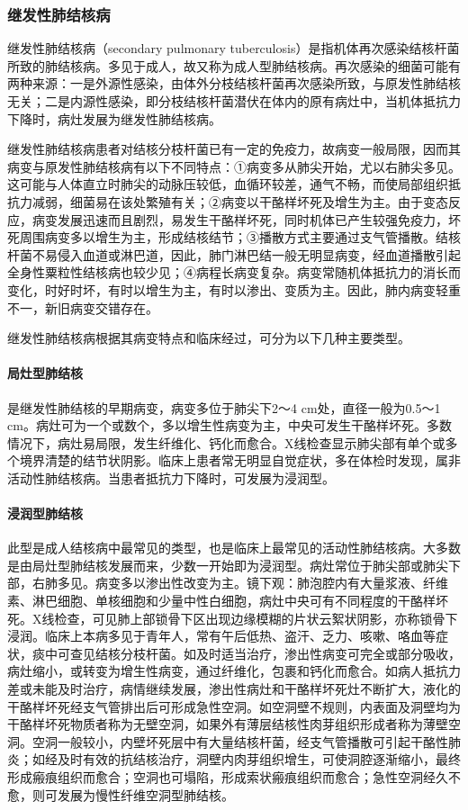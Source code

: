\subsubsection{继发性肺结核病}

继发性肺结核病（secondary pulmonary
tuberculosis）是指机体再次感染结核杆菌所致的肺结核病。多见于成人，故又称为成人型肺结核病。再次感染的细菌可能有两种来源：一是外源性感染，由体外分枝结核杆菌再次感染所致，与原发性肺结核无关；二是内源性感染，即分枝结核杆菌潜伏在体内的原有病灶中，当机体抵抗力下降时，病灶发展为继发性肺结核病。

继发性肺结核病患者对结核分枝杆菌已有一定的免疫力，故病变一般局限，因而其病变与原发性肺结核病有以下不同特点：①病变多从肺尖开始，尤以右肺尖多见。这可能与人体直立时肺尖的动脉压较低，血循环较差，通气不畅，而使局部组织抵抗力减弱，细菌易在该处繁殖有关；②病变以干酪样坏死及增生为主。由于变态反应，病变发展迅速而且剧烈，易发生干酪样坏死，同时机体已产生较强免疫力，坏死周围病变多以增生为主，形成结核结节；③播散方式主要通过支气管播散。结核杆菌不易侵入血道或淋巴道，因此，肺门淋巴结一般无明显病变，经血道播散引起全身性粟粒性结核病也较少见；④病程长病变复杂。病变常随机体抵抗力的消长而变化，时好时坏，有时以增生为主，有时以渗出、变质为主。因此，肺内病变轻重不一，新旧病变交错存在。

继发性肺结核病根据其病变特点和临床经过，可分为以下几种主要类型。

\paragraph{局灶型肺结核}
是继发性肺结核的早期病变，病变多位于肺尖下2～4
cm处，直径一般为0.5～1
cm。病灶可为一个或数个，多以增生性病变为主，中央可发生干酪样坏死。多数情况下，病灶易局限，发生纤维化、钙化而愈合。X线检查显示肺尖部有单个或多个境界清楚的结节状阴影。临床上患者常无明显自觉症状，多在体检时发现，属非活动性肺结核病。当患者抵抗力下降时，可发展为浸润型。

\paragraph{浸润型肺结核}
此型是成人结核病中最常见的类型，也是临床上最常见的活动性肺结核病。大多数是由局灶型肺结核发展而来，少数一开始即为浸润型。病灶常位于肺尖部或肺尖下部，右肺多见。病变多以渗出性改变为主。镜下观：肺泡腔内有大量浆液、纤维素、淋巴细胞、单核细胞和少量中性白细胞，病灶中央可有不同程度的干酪样坏死。X线检查，可见肺上部锁骨下区出现边缘模糊的片状云絮状阴影，亦称锁骨下浸润。临床上本病多见于青年人，常有午后低热、盗汗、乏力、咳嗽、咯血等症状，痰中可查见结核分枝杆菌。如及时适当治疗，渗出性病变可完全或部分吸收，病灶缩小，或转变为增生性病变，通过纤维化，包裹和钙化而愈合。如病人抵抗力差或未能及时治疗，病情继续发展，渗出性病灶和干酪样坏死灶不断扩大，液化的干酪样坏死经支气管排出后可形成急性空洞。如空洞壁不规则，内表面及洞壁均为干酪样坏死物质者称为无壁空洞，如果外有薄层结核性肉芽组织形成者称为薄壁空洞。空洞一般较小，内壁坏死层中有大量结核杆菌，经支气管播散可引起干酪性肺炎；如经及时有效的抗结核治疗，洞壁内肉芽组织增生，可使洞腔逐渐缩小，最终形成瘢痕组织而愈合；空洞也可塌陷，形成索状瘢痕组织而愈合；急性空洞经久不愈，则可发展为慢性纤维空洞型肺结核。

